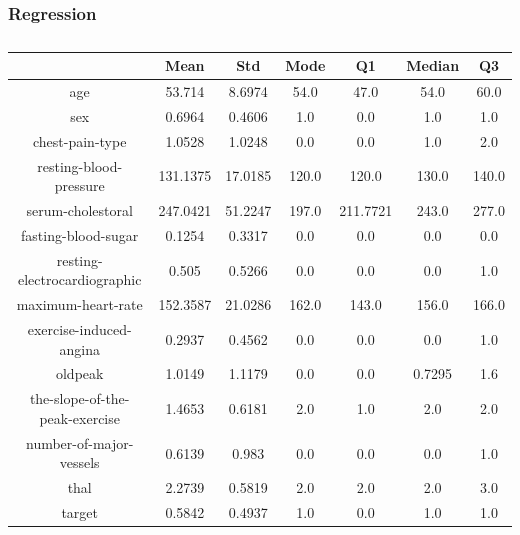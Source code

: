 \documentclass{classrep}
\begin{document}
{{            \subsubsection{Regression}
            \label{results:15-percent:regression} {
                \begin{table}[!htbp]
                    \centering
                    \begin{tabular}{|c|c|c|c|c|c|c|}
                        \hline
                        & Mean & Std & Mode & Q1 & Median & Q3 \\ \hline
                        age & 53.714 & 8.6974 & 54.0 & 47.0 & 54.0 & 60.0 \\ \hline
                        sex & 0.6964 & 0.4606 & 1.0 & 0.0 & 1.0 & 1.0 \\ \hline
                        chest-pain-type & 1.0528 & 1.0248 & 0.0 & 0.0 & 1.0 & 2.0 \\ \hline
                        resting-blood-pressure & 131.1375 & 17.0185 & 120.0 & 120.0 & 130.0 & 140.0 \\ \hline
                        serum-cholestoral & 247.0421 & 51.2247 & 197.0 & 211.7721 & 243.0 & 277.0 \\ \hline
                        fasting-blood-sugar & 0.1254 & 0.3317 & 0.0 & 0.0 & 0.0 & 0.0 \\ \hline
                        resting-electrocardiographic & 0.505 & 0.5266 & 0.0 & 0.0 & 0.0 & 1.0 \\ \hline
                        maximum-heart-rate & 152.3587 & 21.0286 & 162.0 & 143.0 & 156.0 & 166.0 \\ \hline
                        exercise-induced-angina & 0.2937 & 0.4562 & 0.0 & 0.0 & 0.0 & 1.0 \\ \hline
                        oldpeak & 1.0149 & 1.1179 & 0.0 & 0.0 & 0.7295 & 1.6 \\ \hline
                        the-slope-of-the-peak-exercise & 1.4653 & 0.6181 & 2.0 & 1.0 & 2.0 & 2.0 \\ \hline
                        number-of-major-vessels & 0.6139 & 0.983 & 0.0 & 0.0 & 0.0 & 1.0 \\ \hline
                        thal & 2.2739 & 0.5819 & 2.0 & 2.0 & 2.0 & 3.0 \\ \hline
                        target & 0.5842 & 0.4937 & 1.0 & 0.0 & 1.0 & 1.0 \\ \hline
                    \end{tabular}
                    \caption{}
                    \label{result_15_Regression}
                \end{table}
                \FloatBarrier

}}}
\end{document}
